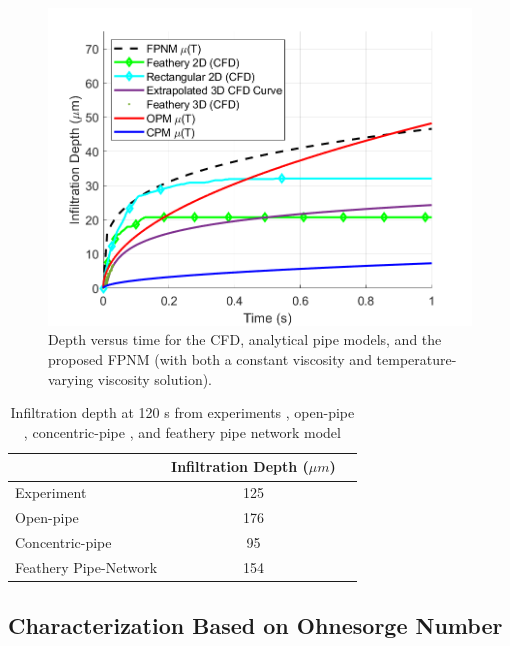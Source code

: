 \documentclass[%
 aip,
 amsmath,amssymb,
 reprint,%
]{revtex4-1}
\begin{document}
\begin{figure}[htp!]
    \centering
    \includegraphics[width=\linewidth]{Figures/analytical.png}
    \caption{Depth versus time for the CFD, analytical pipe models, and the proposed FPNM (with both a constant viscosity and temperature-varying viscosity solution).}
    \label{fig:pipeNetworkResults}
\end{figure}

\begin{table}[htp!]
\caption{\label{tab:resultsCompare} Infiltration depth at 120 s from experiments \cite{Naraparaju2019}, open-pipe \cite{Naraparaju2019}, concentric-pipe \cite{Naraparaju2019}, and feathery pipe network model}
\centering
\begin{ruledtabular}
\begin{tabular}{lcc}
 & Infiltration Depth ($\mu m$)\\
\hline
Experiment & 125\\
Open-pipe & 176\\
Concentric-pipe & 95\\
Feathery Pipe-Network & 154
\end{tabular}
\end{ruledtabular}
\end{table}

\subsection{Characterization Based on Ohnesorge Number}
\end{document}
